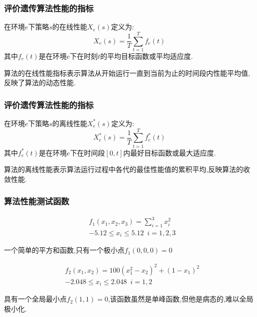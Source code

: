 \documentclass{beamer}
\begin{document}
	\begin{frame}
		\frametitle{评价遗传算法性能的指标}
	\begin{definition}
		在环境$e$下策略$s$的在线性能$X_e(s)$定义为:
		\begin{displaymath}
			X_e(s)=\frac{1}{T}\sum_{t=1}^T f_e(t)
		\end{displaymath}
		其中$f_e(t)$是在环境$e$下在时刻$t$的平均目标函数或平均适应度.
	\end{definition}
	算法的在线性能指标表示算法从开始运行一直到当前为止的时间段内性能平均值,反映了算法的动态性能.
	\end{frame}
	\begin{frame}
		\frametitle{评价遗传算法性能的指标}
	\begin{definition}
		在环境$e$下策略$s$的离线性能$X_e^*(s)$定义为:
		\begin{displaymath}
			X_e^*(s)=\frac{1}{T}\sum_{t=1}^T f_e^*(t)
		\end{displaymath}
		其中$f_e^*(t)$是在环境$e$下在时间段$[0,t]$内最好目标函数或最大适应度.
	\end{definition}
	算法的离线性能表示算法运行过程中各代的最佳性能值的累积平均,反映算法的收敛性能.
	\end{frame}
	\begin{frame}
		\frametitle{算法性能测试函数}
		\begin{definition}
			\begin{eqnarray*}
				&f_1(x_1,x_2,x_3)=\sum_{i=1}^{3} x_i^2\\
				&-5.12\le x_i \le 5.12 \,\,\,i=1,2,3
			\end{eqnarray*}
		\end{definition}
		一个简单的平方和函数,只有一个极小点$f_1(0,0,0)=0$
	
	
		\begin{definition}
			\begin{eqnarray*}
				&f_2(x_1,x_2)=100(x_1^2-x_2)^2+(1-x_1)^2\\
				&-2.048\le x_i \le 2.048 \,\,\,i=1,2
			\end{eqnarray*}
		\end{definition}
		具有一个全局最小点$f_2(1,1)=0 $,该函数虽然是单峰函数,但他是病态的,难以全局极小化.
		
		
	\end{frame}
\end{document}
